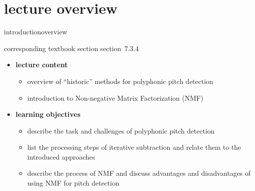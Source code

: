 


\subtitle{Module 7.3.4: Fundamental Frequency Detection in Polyphonic Signals}


	

    \section[overview]{lecture overview}
        \begin{frame}{introduction}{overview}
            \begin{block}{corresponding textbook section}
                    section~7.3.4
            \end{block}

            \begin{itemize}
                \item   \textbf{lecture content}
                    \begin{itemize}
                        \item   overview of ``historic'' methods for polyphonic pitch detection
                        \item   introduction to Non-negative Matrix Factorization (NMF)
                    \end{itemize}
                \bigskip
                \item<2->   \textbf{learning objectives}
                    \begin{itemize}
                        \item   describe the task and challenges of polyphonic pitch detection
                        \item   list the processing steps of iterative subtraction and relate them to the introduced approaches
                        \item   describe the process of NMF and discuss advantages and disadvantages of using NMF for pitch detection
                    \end{itemize}
            \end{itemize}
        \end{frame}

